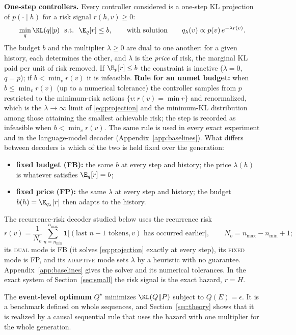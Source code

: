\textbf{One-step controllers.} Every controller considered is a one-step KL projection of $p(\cdot\mid h)$ for a risk signal $r(h,v)\ge 0$:
\begin{equation}\label{eq:projection}
\min_q \KL(q\Vert p)\ \ \text{s.t.}\ \ \E_q[r]\le b,\qquad\text{with solution}\qquad q_\lambda(v)\propto p(v)\,e^{-\lambda r(v)} .
\end{equation}
The budget $b$ and the multiplier $\lambda\ge 0$ are dual to one another: for a given history, each determines the other, and $\lambda$ is the \emph{price} of risk, the marginal KL paid per unit of risk removed. If $\E_p[r]\le b$ the constraint is inactive ($\lambda=0$, $q=p$); if $b<\min_v r(v)$ it is infeasible. \textbf{Rule for an unmet budget:} when $b\le\min_vr(v)$ (up to a numerical tolerance) the controller samples from $p$ restricted to the minimum-risk actions $\{v:r(v)=\min r\}$ and renormalized, which is the $\lambda\to\infty$ limit of \eqref{eq:projection} and the minimum-KL distribution among those attaining the smallest achievable risk; the step is recorded as infeasible when $b<\min_vr(v)$. The same rule is used in every exact experiment and in the language-model decoder (Appendix~\ref{app:baselines}). What differs between decoders is which of the two is held fixed over the generation:
\begin{itemize}[leftmargin=*,itemsep=1pt]
\item \textbf{fixed budget (FB):} the same $b$ at every step and history; the price $\lambda(h)$ is whatever satisfies $\E_q[r]=b$;
\item \textbf{fixed price (FP):} the same $\lambda$ at every step and history; the budget $b(h)=\E_{q_\lambda}[r]$ then adapts to the history.
\end{itemize}
The recurrence-risk decoder studied below uses the recurrence risk
\[
r(v)=\frac1{N_o}\sum_{n=n_{\min}}^{n_{\max}}\mathbf{1}\big[(\text{last }n{-}1\text{ tokens},v)\text{ has occurred earlier}\big],\qquad N_o=n_{\max}-n_{\min}+1;
\]
its \textsc{dual} mode is FB (it solves \eqref{eq:projection} exactly at every step), its \textsc{fixed} mode is FP, and its \textsc{adaptive} mode sets $\lambda$ by a heuristic with no guarantee. Appendix~\ref{app:baselines} gives the solver and its numerical tolerances. In the exact system of Section~\ref{sec:small} the risk signal is the exact hazard, $r=H$.

The \textbf{event-level optimum} $Q^\star$ minimizes $\KL(Q\Vert P)$ subject to $Q(E)=\epsilon$. It is a benchmark defined on whole sequences, and Section~\ref{sec:theory} shows that it is realized by a causal sequential rule that uses the hazard with one multiplier for the whole generation.
